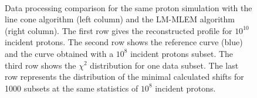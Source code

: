 \begin{figure}
 \\
\caption{Data processing comparison for the same proton simulation with the line cone algorithm (left column) and the LM-MLEM algorithm (right column). The first row gives the reconstructed profile for $10^{10}$ incident protons. The second row shows the reference curve (blue) and the curve obtained with a $10^8$ incident protons subset. The third row shows the $\chi^2$ distribution for one data subset. The last row represents the distribution of the minimal calculated shifts for 1000 subsets at the same statistics of $10^8$ incident protons.}
\end{figure}

